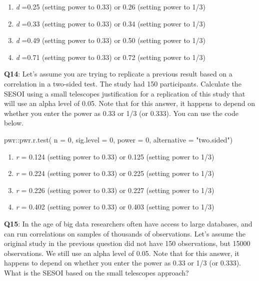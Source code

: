 \documentclass[
  oneside]{krantz}
\makeatletter
\newenvironment{Shaded}{\begin{snugshade}}{\end{snugshade}}
\newcommand{\AttributeTok}[1]{\textcolor[rgb]{0.61,0.61,0.61}{#1}}
\newcommand{\DecValTok}[1]{\textcolor[rgb]{0.06,0.06,0.06}{#1}}
\newcommand{\FunctionTok}[1]{\textcolor[rgb]{0,0,0}{#1}}
\newcommand{\NormalTok}[1]{#1}
\newcommand{\SpecialCharTok}[1]{\textcolor[rgb]{0,0,0}{#1}}
\newcommand{\StringTok}[1]{\textcolor[rgb]{0.5,0.5,0.5}{#1}}
\providecommand{\tightlist}{%
  \setlength{\itemsep}{0pt}\setlength{\parskip}{0pt}}
\newenvironment{kframe}{%
\medskip{}
\setlength{\fboxsep}{.8em}
 \def\at@end@of@kframe{}%
 \ifinner\ifhmode%
  \def\at@end@of@kframe{\end{minipage}}%
  \begin{minipage}{\columnwidth}%
 \fi\fi%
 \def\FrameCommand##1{\hskip\@totalleftmargin \hskip-\fboxsep
 \colorbox{shadecolor}{##1}\hskip-\fboxsep
     \hskip-\linewidth \hskip-\@totalleftmargin \hskip\columnwidth}%
 \MakeFramed {\advance\hsize-\width
   \@totalleftmargin\z@ \linewidth\hsize
   \@setminipage}}%
 {\par\unskip\endMakeFramed%
 \at@end@of@kframe}
\renewenvironment{Shaded}{\begin{kframe}}{\end{kframe}}
\makeatother
\begin{document}
\begin{enumerate}
\def\labelenumi{\Alph{enumi})}
\tightlist
\item
  \emph{d} =0.25 (setting power to 0.33) or 0.26 (setting power to 1/3)
\item
  \emph{d} =0.33 (setting power to 0.33) or 0.34 (setting power to 1/3)
\item
  \emph{d} =0.49 (setting power to 0.33) or 0.50 (setting power to 1/3)
\item
  \emph{d} =0.71 (setting power to 0.33) or 0.72 (setting power to 1/3)
\end{enumerate}

\textbf{Q14}: Let's assume you are trying to replicate a previous result based on a correlation in a two-sided test. The study had 150 participants. Calculate the SESOI using a small telescopes justification for a replication of this study that will use an alpha level of 0.05. Note that for this answer, it happens to depend on whether you enter the power as 0.33 or 1/3 (or 0.333). You can use the code below.

\begin{Shaded}
\begin{Highlighting}[]
\NormalTok{pwr}\SpecialCharTok{::}\FunctionTok{pwr.r.test}\NormalTok{(}
  \AttributeTok{n =} \DecValTok{0}\NormalTok{, }
  \AttributeTok{sig.level =} \DecValTok{0}\NormalTok{, }
  \AttributeTok{power =} \DecValTok{0}\NormalTok{, }
  \AttributeTok{alternative =} \StringTok{"two.sided"}\NormalTok{)}
\end{Highlighting}
\end{Shaded}

\begin{enumerate}
\def\labelenumi{\Alph{enumi})}
\tightlist
\item
  \emph{r} = 0.124 (setting power to 0.33) or 0.125 (setting power to 1/3)
\item
  \emph{r} = 0.224 (setting power to 0.33) or 0.225 (setting power to 1/3)
\item
  \emph{r} = 0.226 (setting power to 0.33) or 0.227 (setting power to 1/3)
\item
  \emph{r} = 0.402 (setting power to 0.33) or 0.403 (setting power to 1/3)
\end{enumerate}

\textbf{Q15}: In the age of big data researchers often have access to large databases, and can run correlations on samples of thousands of observations. Let's assume the original study in the previous question did not have 150 observations, but 15000 observations. We still use an alpha level of 0.05. Note that for this answer, it happens to depend on whether you enter the power as 0.33 or 1/3 (or 0.333). What is the SESOI based on the small telescopes approach?
\end{document}
